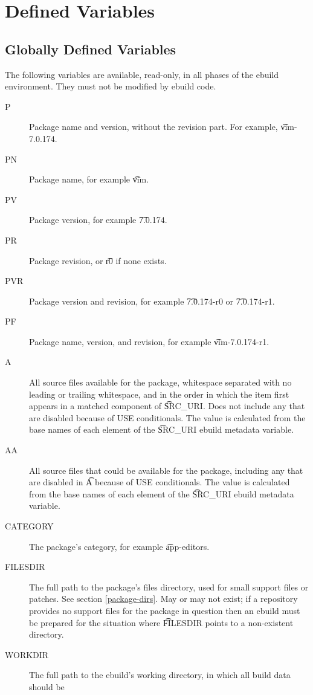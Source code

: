 \section{Defined Variables}
\label{ebuild-env-vars}

\subsection{Globally Defined Variables}
\label{global-ebuild-vars}

The following variables are available, read-only, in all phases of the ebuild environment. They
must not be modified by ebuild code.
\begin{description}
\item[P] Package name and version, without the revision part. For example, \t{vim-7.0.174}.
\item[PN] Package name, for example \t{vim}.
\item[PV] Package version, for example \t{7.0.174}.
\item[PR] Package revision, or \t{r0} if none exists.
\item[PVR] Package version and revision, for example \t{7.0.174-r0} or \t{7.0.174-r1}.
\item[PF] Package name, version, and revision, for example \t{vim-7.0.174-r1}.
\item[A] All source files available for the package, whitespace separated with no leading
    or trailing whitespace, and in the order in which the item first appears in a matched
    component of \t{SRC\_URI}. Does not include any that are disabled because
    of USE conditionals. The value is calculated from the base names of each element of the
    \t{SRC\_URI} ebuild metadata variable.
\item[AA] All source files that could be available for the package, including any that are disabled
    in \t{A} because of USE conditionals. The value is calculated from the base names of each element
    of the \t{SRC\_URI} ebuild metadata variable.
\item[CATEGORY] The package's category, for example \t{app-editors}.
\item[FILESDIR] The full path to the package's files directory, used for small support files or
    patches. See section \ref{package-dirs}. May or may not exist; if a repository provides no
    support files for the package in question then an ebuild must be prepared for the situation
    where \t{FILESDIR} points to a non-existent directory.
\item[WORKDIR] The full path to the ebuild's working directory, in which all build data should be

\end{description}
